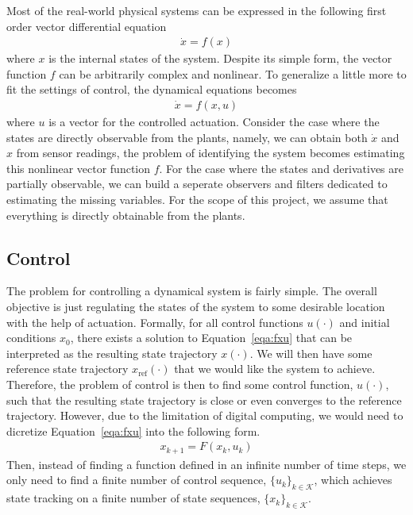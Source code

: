\documentclass[10pt,twocolumn]{article}
\begin{document}
Most of the real-world physical systems can be expressed in the following first order
vector differential equation
\begin{gather}\label{eqa:fx}
  \dot{x} = f(x)
\end{gather}
where $x$ is the internal states of the system. Despite its simple form, the vector
function $f$ can be arbitrarily complex and nonlinear. To generalize a little more
to fit the settings of control, the dynamical equations becomes
\begin{gather}\label{eqa:fxu}
  \dot{x} = f(x, u)
\end{gather}
where $u$ is a vector for the controlled actuation. Consider the case where the
states are directly observable from the plants, namely, we can obtain both $\dot{x}$
and $x$ from sensor readings, the problem of identifying the system becomes
estimating this nonlinear vector function $f$. For the case where the states
and derivatives are partially observable, we can build a seperate observers and filters dedicated
to estimating the missing variables. For the scope of this project, we assume that everything is
directly obtainable from the plants.

\subsection{Control}
The problem for controlling a dynamical system is fairly simple. The overall objective is
just regulating the states of the system to some desirable location with the help of actuation.
Formally, for all control functions $u(\cdot)$ and initial conditions $x_0$, there
exists a solution to Equation~\ref{eqa:fxu} that can be interpreted as the resulting
state trajectory $x(\cdot)$. We will then have some reference state trajectory
$x_{\mathrm{ref}}(\cdot)$ that we would like the system to achieve. Therefore, the
problem of control is then to find some control function, $u(\cdot)$, such that the
resulting state trajectory is close or even converges to the reference trajectory. However,
due to the limitation of digital computing, we would need to dicretize
Equation~\ref{eqa:fxu} into the following form.
\begin{gather}
  x_{k+1} = F(x_k, u_k)
\end{gather}
Then, instead of finding a function defined in an infinite number of time steps, we only need to
find a finite number of control sequence, $\{u_k\}_{k \in \mathcal{K}}$, which achieves
state tracking on a finite number of state sequences, $\{x_k\}_{k \in \mathcal{K}}$.
\end{document}
